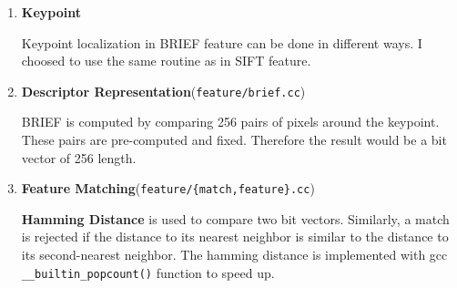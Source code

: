 \begin{enumerate}
  \item \textbf{Keypoint}

    Keypoint localization in BRIEF feature can be done in different ways. I choosed to use the same routine as in SIFT feature.

  \item \textbf{Descriptor Representation}(\verb|feature/brief.cc|)

    BRIEF is computed by comparing 256 pairs of pixels around the keypoint. These pairs are pre-computed and fixed.
    Therefore the result would be a bit vector of 256 length.

  \item \textbf{Feature Matching}(\verb|feature/{match,feature}.cc|)

    \textbf{Hamming Distance} is used to compare two bit vectors.
    Similarly, a match is rejected if the distance to its nearest neighbor is similar to the distance to its second-nearest neighbor.
    The hamming distance is implemented with gcc \verb|__builtin_popcount()| function to speed up.

\end{enumerate}

